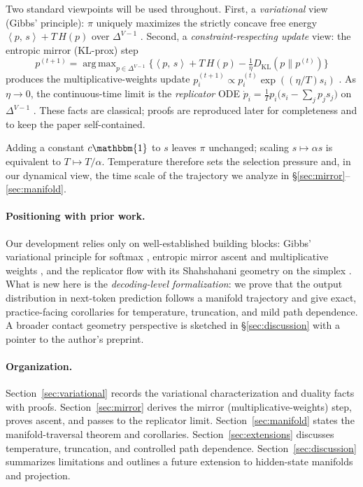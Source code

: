 \documentclass[11pt,reqno]{article}
\numberwithin{equation}{section}
\theoremstyle{plain}
\theoremstyle{definition}
\theoremstyle{remark}
\DeclareMathOperator*{\argmax}{arg\,max}
\newcommand{\1}{\mathbbm{1}}
\newcommand{\ip}[2]{\left\langle #1,\, #2 \right\rangle}
\newcommand{\simplex}{\Delta^{V-1}}
\begin{document}
Two standard viewpoints will be used throughout. First, a \emph{variational} view
(Gibbs’ principle): $\pi$ uniquely maximizes the strictly concave free energy
$\ip{p}{s}+T\,H(p)$ over $\simplex$ \citep{jaynes1957information,cover2006elements,boyd2004convex}.
Second, a \emph{constraint-respecting update} view: the entropic mirror (KL-prox) step
\[
p^{(t+1)}=\argmax_{p\in\simplex}\Big\{\ip{p}{s}+T\,H(p)-\tfrac{1}{\eta}D_{\mathrm{KL}}(p\|p^{(t)})\Big\}
\]
produces the multiplicative-weights update
$p^{(t+1)}_i \propto p^{(t)}_i \exp((\eta/T)s_i)$
\citep{beck2003mirror,arora2012multiplicative,raginsky2012mirror}. As $\eta\to 0$, the
continuous-time limit is the \emph{replicator} ODE
$\dot p_i=\tfrac{1}{T}p_i\big(s_i-\sum_j p_j s_j\big)$ on $\simplex$
\citep{shahshahani1979nouvelle,hofbauer1998evolutionary}. These facts are classical; proofs are
reproduced later for completeness and to keep the paper self-contained.


Adding a constant $c\1$ to $s$ leaves $\pi$ unchanged; scaling $s\mapsto \alpha s$ is equivalent to
$T\mapsto T/\alpha$. Temperature therefore sets the selection pressure and, in our dynamical view,
the time scale of the trajectory we analyze in \S\ref{sec:mirror}–\ref{sec:manifold}.

\paragraph{Positioning with prior work.}
Our development relies only on well-established building blocks: Gibbs’ variational principle for
softmax \citep{jaynes1957information,cover2006elements}, entropic mirror ascent and multiplicative
weights \citep{beck2003mirror,arora2012multiplicative,raginsky2012mirror}, and the replicator flow
with its Shahshahani geometry on the simplex \citep{shahshahani1979nouvelle,hofbauer1998evolutionary}.
What is new here is the \emph{decoding-level formalization}: we prove that the output distribution in
next-token prediction follows a manifold trajectory and give exact, practice-facing corollaries for
temperature, truncation, and mild path dependence. A broader contact geometry perspective is sketched
in \S\ref{sec:discussion} with a pointer to the author’s preprint.

\paragraph{Organization.}
Section~\ref{sec:variational} records the variational characterization and duality facts with proofs.
Section~\ref{sec:mirror} derives the mirror (multiplicative-weights) step, proves ascent, and passes
to the replicator limit. Section~\ref{sec:manifold} states the manifold-traversal theorem and corollaries.
Section~\ref{sec:extensions} discusses temperature, truncation, and controlled path dependence.
Section~\ref{sec:discussion} summarizes limitations and outlines a future extension to hidden-state
manifolds and projection.
\end{document}
